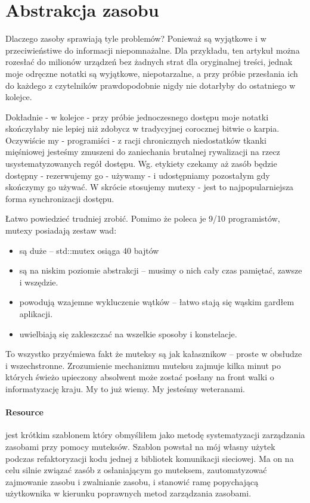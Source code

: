 \section{Abstrakcja zasobu}\label{sec:resource}
Dlaczego zasoby sprawiają tyle problemów? Ponieważ są wyjątkowe i w przeciwieństiwe do informacji niepomnażalne. Dla przykładu, ten artykuł można rozesłać do milionów urządzeń bez żadnych strat dla oryginalnej treści, jednak moje odręczne notatki są wyjątkowe, niepotarzalne, a przy próbie przesłania ich do każdego z czytelników prawdopodobnie nigdy nie dotarłyby do ostatniego w kolejce.

Dokładnie - w kolejce - przy próbie jednoczesnego dostępu moje notatki skończyłaby nie lepiej niż zdobycz w tradycyjnej corocznej bitwie o karpia. Oczywiście my - programiści - z racji chronicznych niedostatków tkanki mięśniowej jesteśmy zmuszeni do zaniechania brutalnej rywalizacji na rzecz usystematyzowanych regół dostępu. Wg. etykiety czekamy aż zasób będzie dostępny - rezerwujemy go - używamy - i udostępniamy pozostałym gdy skończymy go używać. W skrócie stosujemy mutexy - jest to najpopularniejsza forma synchronizacji dostępu.

Łatwo powiedzieć trudniej zrobić. Pomimo że poleca je 9/10 programistów, mutexy posiadają zestaw wad:
\begin{itemize}
\item są duże -- std::mutex osiąga 40 bajtów
\item są na niskim poziomie abstrakcji -- musimy o nich cały czas pamiętać, zawsze i wszędzie.
\item powodują wzajemne wykluczenie wątków -- łatwo stają się wąskim gardłem aplikacji.
\item uwielbiają się zakleszczać na wszelkie sposoby i konstelacje.
\end{itemize}
To wszystko przyćmiewa fakt że muteksy są jak kałasznikow -- proste w obsłudze i wszechstronne. Zrozumienie mechanizmu muteksu zajmuje kilka minut po których świeżo upieczony absolwent może zostać posłany na front walki o informatyzację kraju. My to już wiemy. My jesteśmy weteranami.

\paragraph{Resource}
 jest krótkim szablonem który obmyśliłem jako metodę systematyzacji zarządzania zasobami przy pomocy muteksów. Szablon powstał na mój własny użytek podczas refaktoryzacji kodu jednej z bibliotek komunikacji sieciowej. Ma on na celu silnie związać zasób z osłaniającym go muteksem, zautomatyzować zajmowanie zasobu i zwalnianie zasobu, i stanowić ramę popychającą użytkownika w kierunku poprawnych metod zarządzania zasobami.

